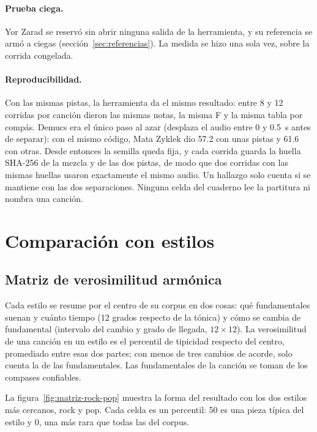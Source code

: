\paragraph{Prueba ciega.} Yor Zarad se reservó sin abrir ninguna salida de la herramienta, y su referencia se armó a
ciegas (sección~\ref{sec:referencias}). La medida se hizo una sola vez, sobre la corrida congelada.

\paragraph{Reproducibilidad.} Con las mismas pistas, la herramienta da el mismo resultado: entre 8 y 12 corridas por
canción dieron las mismas notas, la misma F y la misma tabla por compás. Demucs era el único paso al azar (desplaza el
audio entre 0 y 0.5~s antes de separar): con el mismo código, Mata Zyklek dio 57.2 con unas pistas y 61.6 con otras.
Desde entonces la semilla queda fija, y cada corrida guarda la huella SHA-256 \citep{nist2015} de la mezcla y de las dos
pistas, de modo que dos corridas con las mismas huellas usaron exactamente el mismo audio. Un hallazgo solo cuenta si se
mantiene con las dos separaciones. Ninguna celda del cuaderno lee la partitura ni nombra una canción.

\section{Comparación con estilos}\label{sec:comparacion}

\subsection{Matriz de verosimilitud armónica}

Cada estilo se resume por el centro de su corpus en dos cosas: qué fundamentales suenan y cuánto tiempo (12 grados
respecto de la tónica) y cómo se cambia de fundamental (intervalo del cambio y grado de llegada, $12 \times 12$). La
verosimilitud de una canción en un estilo es el percentil de tipicidad respecto del centro, promediado entre esas dos
partes; con menos de tres cambios de acorde, solo cuenta la de las fundamentales. Las fundamentales de la canción se
toman de los compases confiables.

La figura~\ref{fig:matriz-rock-pop} muestra la forma del resultado con los dos estilos más cercanos, rock y pop. Cada
celda es un percentil: 50 es una pieza típica del estilo y 0, una más rara que todas las del corpus.

